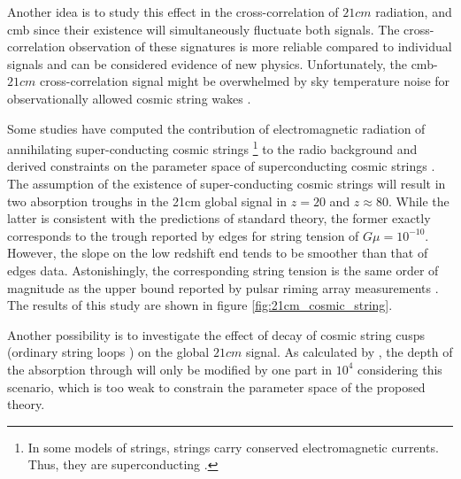 \documentclass[12pt, TexShade, letterpaper]{report}
\begin{document}
Another idea is to study this effect in the cross-correlation of $21cm$ radiation, and \gls{cmb} since their existence will simultaneously fluctuate both signals. The cross-correlation observation of these signatures is more reliable compared to individual signals and can be considered evidence of new physics. Unfortunately, the \gls{cmb}-$21cm$ cross-correlation signal might be overwhelmed by sky temperature noise for observationally allowed cosmic string wakes \cite{corre_21cm_cmb}.

Some studies have computed the contribution of electromagnetic radiation of annihilating super-conducting cosmic strings \footnote{In some models of strings, strings carry conserved electromagnetic currents. Thus, they are superconducting \cite{constrain_superconduct}.}  to the radio background and derived constraints on the parameter space of superconducting cosmic strings \cite{constrain_superconduct, constrain_spectral_bryce, massive_BH}. The assumption of the existence of super-conducting cosmic strings will result in two absorption troughs in the 21cm global signal in $z=20$ and $z\approx 80$. While the latter is consistent with the predictions of standard theory, the former exactly corresponds to the trough reported by \gls{edges} for string tension of $G\mu = 10 ^{-10}$. However, the slope on the low redshift end tends to be smoother than that of \gls{edges} data. Astonishingly, the corresponding string tension is the same order of magnitude as the upper bound reported by pulsar riming array measurements \cite{cosmic_string_jordan_robert, pulsar_timing}. The results of this study are shown in figure \ref{fig:21cm_cosmic_string}.\par
Another possibility is to investigate the effect of decay of cosmic string cusps (ordinary string loops \cite{massive_BH}) on the global $21cm$ signal. As calculated by \cite{robert_cusps}, the depth of the absorption through will only be modified by one part in $10^4$ considering this scenario, which is too weak to constrain the parameter space of the proposed theory.\par

\end{document}
